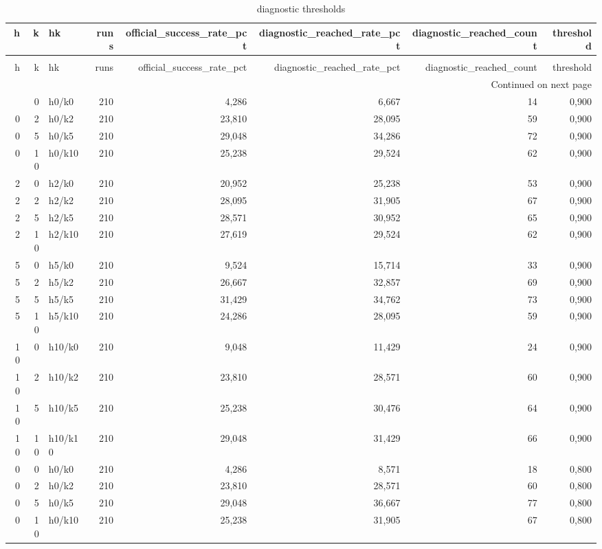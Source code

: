 \begin{longtable}{rrlrrrrr}
\caption{diagnostic thresholds} \label{tab:diagnostic_thresholds} \\
\toprule
h & k & hk & runs & official\_success\_rate\_pct & diagnostic\_reached\_rate\_pct & diagnostic\_reached\_count & threshold \\
\midrule
\endfirsthead
\caption[]{diagnostic thresholds} \\
\toprule
h & k & hk & runs & official\_success\_rate\_pct & diagnostic\_reached\_rate\_pct & diagnostic\_reached\_count & threshold \\
\midrule
\endhead
\midrule
\multicolumn{8}{r}{Continued on next page} \\
\midrule
\endfoot
\bottomrule
\endlastfoot
0 & 0 & h0/k0 & 210 & 4,286 & 6,667 & 14 & 0,900 \\
0 & 2 & h0/k2 & 210 & 23,810 & 28,095 & 59 & 0,900 \\
0 & 5 & h0/k5 & 210 & 29,048 & 34,286 & 72 & 0,900 \\
0 & 10 & h0/k10 & 210 & 25,238 & 29,524 & 62 & 0,900 \\
2 & 0 & h2/k0 & 210 & 20,952 & 25,238 & 53 & 0,900 \\
2 & 2 & h2/k2 & 210 & 28,095 & 31,905 & 67 & 0,900 \\
2 & 5 & h2/k5 & 210 & 28,571 & 30,952 & 65 & 0,900 \\
2 & 10 & h2/k10 & 210 & 27,619 & 29,524 & 62 & 0,900 \\
5 & 0 & h5/k0 & 210 & 9,524 & 15,714 & 33 & 0,900 \\
5 & 2 & h5/k2 & 210 & 26,667 & 32,857 & 69 & 0,900 \\
5 & 5 & h5/k5 & 210 & 31,429 & 34,762 & 73 & 0,900 \\
5 & 10 & h5/k10 & 210 & 24,286 & 28,095 & 59 & 0,900 \\
10 & 0 & h10/k0 & 210 & 9,048 & 11,429 & 24 & 0,900 \\
10 & 2 & h10/k2 & 210 & 23,810 & 28,571 & 60 & 0,900 \\
10 & 5 & h10/k5 & 210 & 25,238 & 30,476 & 64 & 0,900 \\
10 & 10 & h10/k10 & 210 & 29,048 & 31,429 & 66 & 0,900 \\
0 & 0 & h0/k0 & 210 & 4,286 & 8,571 & 18 & 0,800 \\
0 & 2 & h0/k2 & 210 & 23,810 & 28,571 & 60 & 0,800 \\
0 & 5 & h0/k5 & 210 & 29,048 & 36,667 & 77 & 0,800 \\
0 & 10 & h0/k10 & 210 & 25,238 & 31,905 & 67 & 0,800 \\

\end{longtable}
